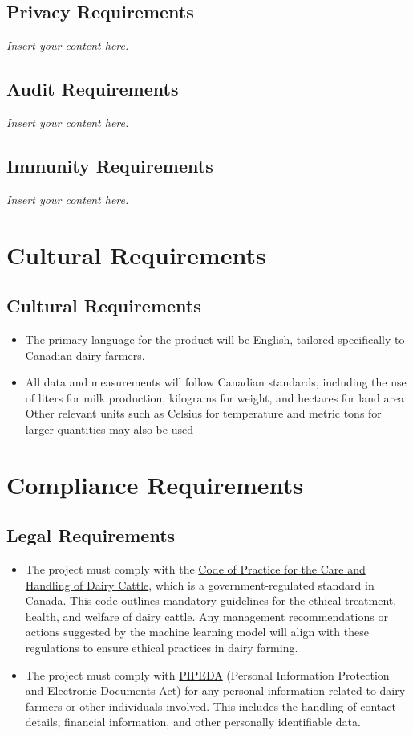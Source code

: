 \documentclass[12pt]{article}
\newcommand{\lips}{\textit{Insert your content here.}}
\begin{document}
\subsection{Privacy Requirements}
\lips
\subsection{Audit Requirements}
\lips
\subsection{Immunity Requirements}
\lips

\section{Cultural Requirements}
\subsection{Cultural Requirements}
\begin{itemize}
  \item The primary language for the product will be English, tailored
  specifically to Canadian dairy farmers. 
  \item All data and measurements will follow Canadian standards, including the
  use of liters for milk production, kilograms for weight, and hectares for land
  area Other relevant units such as Celsius for temperature and metric tons for
  larger quantities may also be used
\end{itemize}

\section{Compliance Requirements}
\subsection{Legal Requirements}
\begin{itemize}
  \item The project must comply with the \href{https://www.nfacc.ca/codes-of-practice/dairy-cattle}{Code of Practice for the Care and Handling of Dairy Cattle}, which is a government-regulated standard in Canada. This code outlines mandatory guidelines for the ethical treatment, health, and welfare of dairy cattle. Any management recommendations or actions suggested by the machine learning model will align with these regulations to ensure ethical practices in dairy farming.
  \item The project must comply with
  \href{https://laws-lois.justice.gc.ca/pdf/p-8.6.pdf}{PIPEDA} (Personal
  Information Protection and Electronic Documents Act) for any personal
  information related to dairy farmers or other individuals involved. This
  includes the handling of contact details, financial information, and other
  personally identifiable data.
\end{itemize}
\end{document}
